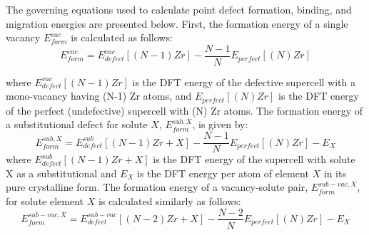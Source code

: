 \documentclass[preprint,12pt]{elsarticle}
\begin{document}
The governing equations used to calculate point defect formation, binding, and migration energies are presented below. First, the formation energy of a single vacancy $E_{form}^{vac}$ is calculated as follows:
\begin{equation}
\label{eq_Ef_vac}
   E_{form}^{vac} = E^{vac}_{defect}[(N-1)Zr] - \frac{N-1}{N} E_{perfect}[(N) Zr] 
\end{equation}

\noindent where $E^{vac}_{defect}[(N-1)Zr]$ is the DFT energy of the defective supercell with a mono-vacancy having (N-1) Zr atoms, and $E_{perfect}[(N) Zr]$ is the DFT energy of the perfect (undefective) supercell with (N) Zr atoms. The formation energy of a substitutional defect for solute $X$, $E_{form}^{sub,X}$, is given by:
\begin{equation}
\label{eq_Ef_sub}
    E_{form}^{sub,X} = E_{defect}^{sub}[(N-1)Zr + X] - \frac{N-1}{N}E_{perfect}[(N) Zr] - E_{X}
\end{equation}
where $E_{defect}^{sub}[(N-1)Zr + X]$ is the DFT energy of the supercell with solute X as a substitutional and $E_X$ is the DFT energy per atom of element $X$ in its pure crystalline form. The formation energy of a vacancy-solute pair, $E_{form}^{sub-vac,X}$, for solute element $X$ is calculated similarly as follows:
\begin{equation}
\label{eq_Ef_vac_sub}
    E_{form}^{sub-vac,X} = E_{defect}^{sub-vac}[(N-2)Zr + X] - \frac{N-2}{N}E_{perfect}[(N) Zr] - E_{X}
\end{equation}
\end{document}
